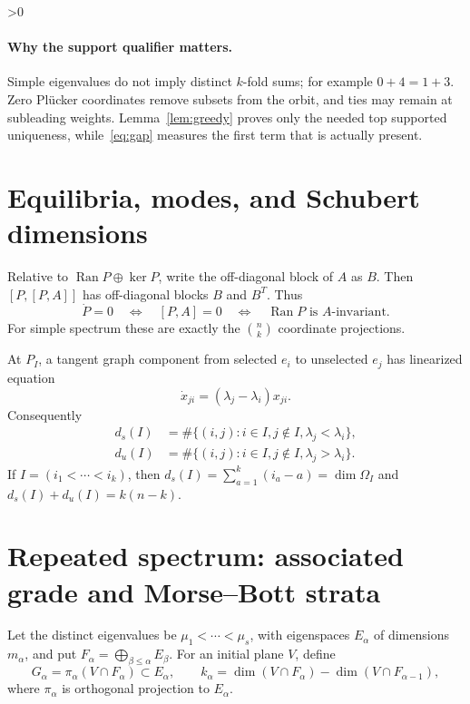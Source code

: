 \documentclass[10pt]{article}
\providecommand{\CRevisionRound}{2}
\newcommand{\Ran}{\operatorname{Ran}}
\begin{document}
\ifnum\CRevisionRound>0
\paragraph{Why the support qualifier matters.}
Simple eigenvalues do not imply distinct $k$-fold sums; for example
$0+4=1+3$.  Zero Pl\"ucker coordinates remove subsets from the orbit, and
ties may remain at subleading weights.  Lemma~\ref{lem:greedy} proves only the
needed top supported uniqueness, while~\eqref{eq:gap} measures the first term
that is actually present.

\section{Equilibria, modes, and Schubert dimensions}
Relative to $\Ran P\oplus\ker P$, write the off-diagonal block of $A$ as $B$.
Then $[P,[P,A]]$ has off-diagonal blocks $B$ and $B^T$.  Thus
\begin{equation}\label{eq:equilibria}
 \dot P=0\quad\Longleftrightarrow\quad[P,A]=0
 \quad\Longleftrightarrow\quad\Ran P\text{ is }A\text{-invariant}.
\end{equation}
For simple spectrum these are exactly the $\binom nk$ coordinate projections.

At $P_I$, a tangent graph component from selected $e_i$ to unselected $e_j$
has linearized equation
\begin{equation}\label{eq:mode}
 \dot x_{ji}=(\lambda_j-\lambda_i)x_{ji}.
\end{equation}
Consequently
\begin{align}
 d_s(I)&=\#\{(i,j):i\in I,j\notin I,\lambda_j<\lambda_i\},\\
 d_u(I)&=\#\{(i,j):i\in I,j\notin I,\lambda_j>\lambda_i\}.
\end{align}
If $I=(i_1<\cdots<i_k)$, then
$d_s(I)=\sum_{a=1}^k(i_a-a)=\dim\Omega_I$ and
$d_s(I)+d_u(I)=k(n-k)$.

\section{Repeated spectrum: associated grade and Morse--Bott strata}
Let the distinct eigenvalues be
$\mu_1<\cdots<\mu_s$, with eigenspaces $E_\alpha$ of dimensions $m_\alpha$,
and put $F_\alpha=\bigoplus_{\beta\le\alpha}E_\beta$.  For an initial plane
$V$, define
\begin{equation}\label{eq:graded}
 G_\alpha=\pi_\alpha(V\cap F_\alpha)\subset E_\alpha,
 \qquad
 k_\alpha=\dim(V\cap F_\alpha)-\dim(V\cap F_{\alpha-1}),
\end{equation}
where $\pi_\alpha$ is orthogonal projection to $E_\alpha$.
\end{document}
